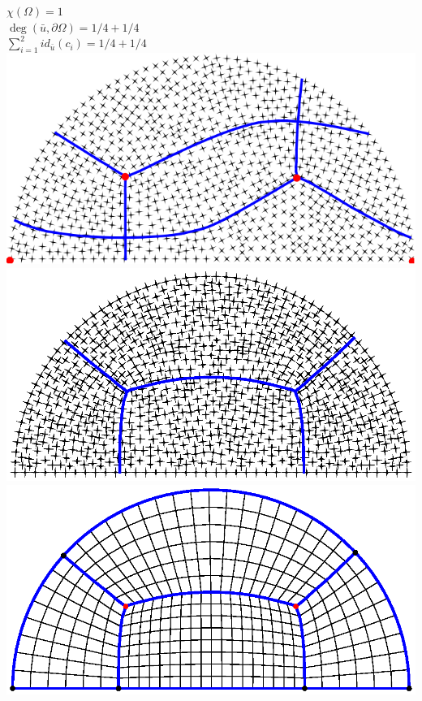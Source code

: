 \documentclass[compress,10pt,aspectratio=169]{beamer}
\begin{document}
\begin{frame}%
\vspace{-0.28cm}
\begin{columns}
\begin{column}{0.4\textwidth}
    \centering
    \scriptsize
    $\chi(\Omega)=1$\\\vspace{0.1cm}
    $\deg(\bar{u}, \partial\Omega) = 1/4+1/4$\\\vspace{0.1cm}
    $\sum_{i=1}^{2} id_{\bar{u}}(c_i)=1/4+1/4$\\\vspace{0.1cm}
    \includegraphics[scale=0.32]{images/demiDiscValPropNonAligne.pdf}\\\vspace{0.1cm}
    \includegraphics[scale=0.32]{images/demiDiscValPropAligne.eps}\\\vspace{0.1cm}
    \includegraphics[scale=0.32]{images/mailDemiDisc.eps}\\

\end{column}
\end{columns}
\end{frame}
\end{document}
